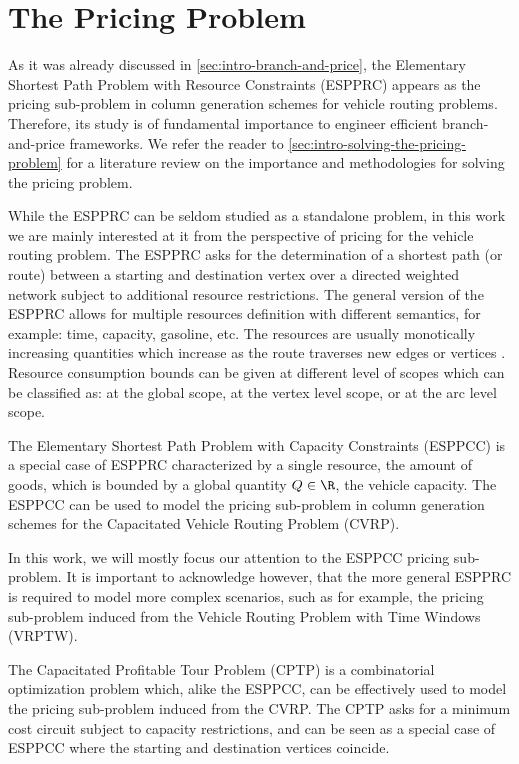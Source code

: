 \chapter{The Pricing Problem}
\label{sec:the-pricing-problem}

As it was already discussed in \cref{sec:intro-branch-and-price},
the Elementary Shortest Path Problem with Resource Constraints (ESPPRC)
appears as the pricing sub-problem in column generation schemes
for vehicle routing problems.
Therefore, its study is of fundamental importance to
engineer efficient branch-and-price frameworks.
We refer the reader to \cref{sec:intro-solving-the-pricing-problem}
for a literature review on the importance and methodologies
for solving the pricing problem.

While the ESPPRC can be seldom studied as a standalone problem,
in this work we are mainly interested at it from the perspective
of pricing for the vehicle routing problem.
The ESPPRC asks for the determination of a shortest path (or route)
between a starting and destination vertex over a directed weighted network
subject to additional resource restrictions.
The general version of the ESPPRC allows for multiple resources definition
with different semantics, for example: time, capacity, gasoline, etc.
The resources are usually monotically increasing quantities which
increase as the route traverses new edges or vertices \parencite{irnich2008resource}.
Resource consumption bounds can be given at different level of scopes which
can be classified as: at the global scope, at the vertex level scope, or at the arc level scope.

The Elementary Shortest Path Problem with Capacity Constraints (ESPPCC) is a special
case of ESPPRC characterized by a single resource, the amount of goods,
which is bounded by a global quantity $Q \in \R$, the vehicle capacity.
The ESPPCC can be used to model the pricing sub-problem in column
generation schemes for the Capacitated Vehicle Routing Problem (CVRP).

In this work, we will mostly focus our attention to the ESPPCC pricing sub-problem.
It is important to acknowledge however, that the
more general ESPPRC is required to model more complex scenarios,
such as for example, the pricing sub-problem induced
from the Vehicle Routing Problem with Time Windows (VRPTW).

The Capacitated Profitable Tour Problem (CPTP) is a combinatorial optimization problem
which, alike the ESPPCC,
can be effectively used to model the pricing sub-problem
induced from the CVRP.
The CPTP asks for a minimum cost circuit subject to capacity restrictions,
and can be seen as a special case of ESPPCC where the starting
and destination vertices coincide.

